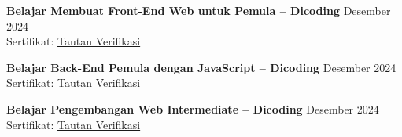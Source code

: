 \documentclass[11pt,a4paper]{article}
\begin{document}
\textbf{Belajar Membuat Front-End Web untuk Pemula -- Dicoding}
\hfill Desember 2024 \\
Sertifikat: \href{https://www.dicoding.com/certificates/1OP8N900QXQK}{Tautan Verifikasi}

\vspace{5pt}

\textbf{Belajar Back-End Pemula dengan JavaScript -- Dicoding}
\hfill Desember 2024 \\
Sertifikat: \href{https://www.dicoding.com/certificates/1OP8WDO28XQK}{Tautan Verifikasi}

\vspace{5pt}

\textbf{Belajar Pengembangan Web Intermediate -- Dicoding}
\hfill Desember 2024 \\
Sertifikat: \href{https://www.dicoding.com/certificates/N9ZOY14GDPG5}{Tautan Verifikasi}
\end{document}
